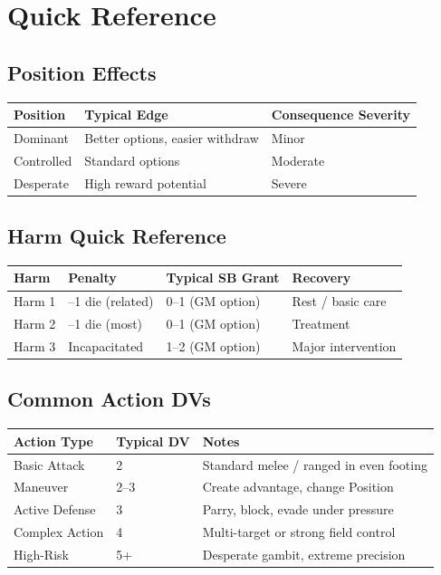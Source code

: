 \section{Quick Reference}\label{sec:combat_quick_ref}

\subsection{Position Effects}\label{subsec:position_quick_ref}
\begin{longtable}{lll}
\toprule
\textbf{Position} & \textbf{Typical Edge} & \textbf{Consequence Severity} \\
\midrule
Dominant   & Better options, easier withdraw & Minor \\
Controlled & Standard options               & Moderate \\
Desperate  & High reward potential          & Severe \\
\bottomrule
\end{longtable}

\subsection{Harm Quick Reference}\label{subsec:harm_quick_ref}
\begin{longtable}{llll}
\toprule
\textbf{Harm} & \textbf{Penalty} & \textbf{Typical SB Grant} & \textbf{Recovery} \\
\midrule
Harm 1 & --1 die (related)      & 0--1 (GM option) & Rest / basic care \\
Harm 2 & --1 die (most)         & 0--1 (GM option) & Treatment \\
Harm 3 & Incapacitated         & 1--2 (GM option) & Major intervention \\
\bottomrule
\end{longtable}

\subsection{Common Action DVs}\label{subsec:action_dvs}
\begin{longtable}{lll}
\toprule
\textbf{Action Type} & \textbf{Typical DV} & \textbf{Notes} \\
\midrule
Basic Attack    & 2 & Standard melee / ranged in even footing \\
Maneuver        & 2--3 & Create advantage, change Position \\
Active Defense  & 3 & Parry, block, evade under pressure \\
Complex Action  & 4 & Multi-target or strong field control \\
High-Risk       & 5+ & Desperate gambit, extreme precision \\
\bottomrule
\end{longtable}

